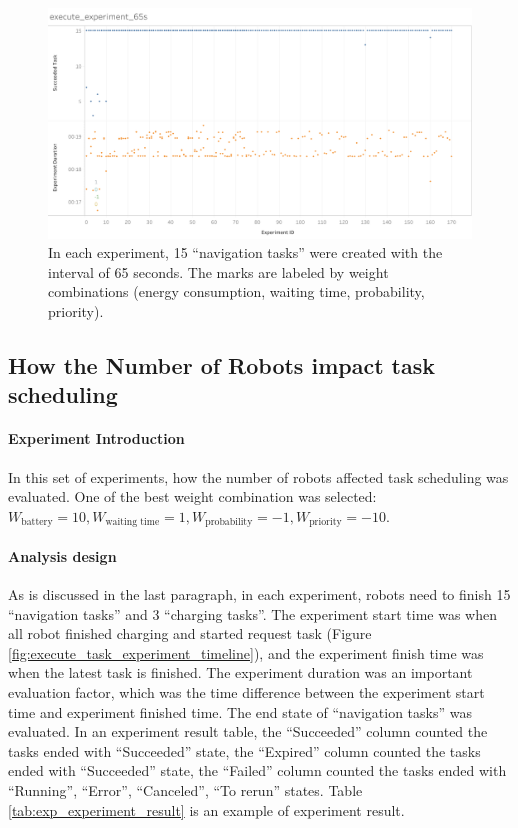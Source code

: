 \begin{figure}[htbp]
 \centering
 \includegraphics[width = 1.0\textwidth]{content/images/ch5/execute_experiment_65s.png}
 \caption{In each experiment, 15 ``navigation tasks'' were created with the interval of 65 seconds. The marks are labeled by weight combinations (energy consumption, waiting time, probability, priority).}
 \label{fig:experiment_task_65s}
\end{figure}

\subsection{How the Number of Robots impact task scheduling}

\paragraph{Experiment Introduction} 
In this set of experiments, how the number of robots affected task scheduling was evaluated. One of the best weight combination was selected: $ W_{\mbox{battery}} = 10,W_{\mbox{waiting time}} = 1, W_{\mbox{probability}} = -1, W_{\mbox{priority}} = -10 $. 
 


\paragraph{Analysis design}
As is discussed in the last paragraph, in each experiment, robots need to finish 15 ``navigation tasks'' and 3 ``charging tasks''.
The experiment start time was when all robot finished charging and started request task (Figure \ref{fig:execute_task_experiment_timeline}), and the experiment finish time was when the latest task is finished.
The experiment duration was an important evaluation factor, which was the time difference between the experiment start time and experiment finished time. 
The end state of ``navigation tasks'' was evaluated. In an experiment result table, the ``Succeeded'' column counted the tasks ended with ``Succeeded'' state, the ``Expired'' column counted the tasks ended with ``Succeeded'' state, the ``Failed'' column counted the tasks ended with ``Running'', ``Error'', ``Canceled'', ``To rerun'' states. 
Table \ref{tab:exp_experiment_result} is an example of experiment result. 

